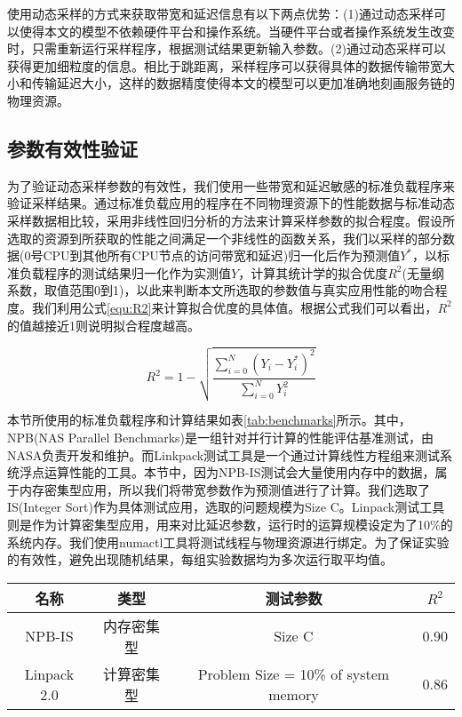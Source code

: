 使用动态采样的方式来获取带宽和延迟信息有以下两点优势：(1)通过动态采样可以使得本文的模型不依赖硬件平台和操作系统。当硬件平台或者操作系统发生改变时，只需重新运行采样程序，根据测试结果更新输入参数。(2)通过动态采样可以获得更加细粒度的信息。相比于跳距离，采样程序可以获得具体的数据传输带宽大小和传输延迟大小，这样的数据精度使得本文的模型可以更加准确地刻画服务链的物理资源。

\subsection{参数有效性验证}
为了验证动态采样参数的有效性，我们使用一些带宽和延迟敏感的标准负载程序来验证采样结果。通过标准负载应用的程序在不同物理资源下的性能数据与标准动态采样数据相比较，采用非线性回归分析的方法来计算采样参数的拟合程度。假设所选取的资源到所获取的性能之间满足一个非线性的函数关系，我们以采样的部分数据(0号CPU到其他所有CPU节点的访问带宽和延迟)归一化后作为预测值$Y^{\ast}$，以标准负载程序的测试结果归一化作为实测值$Y$，计算其统计学的拟合优度$R^{2}$(无量纲系数，取值范围0到1)，以此来判断本文所选取的参数值与真实应用性能的吻合程度。我们利用公式\ref{equ:R2}来计算拟合优度的具体值。根据公式我们可以看出，$R^{2}$的值越接近1则说明拟合程度越高。

\begin{equation}                                                             
\label{equ:R2}
R^{2} = 1 - \sqrt{\frac{\sum_{i= 0}^{N}(Y_{i}-Y_{i}^{\ast})^{2}}{\sum_{i = 0}^{N}Y_{i}^{2}}  }
\end{equation}

本节所使用的标准负载程序和计算结果如表\ref{tab:benchmarks}所示。其中，NPB(NAS Parallel Benchmarks)是一组针对并行计算的性能评估基准测试，由NASA负责开发和维护。而Linkpack测试工具是一个通过计算线性方程组来测试系统浮点运算性能的工具。本节中，因为NPB-IS测试会大量使用内存中的数据，属于内存密集型应用，所以我们将带宽参数作为预测值进行了计算。我们选取了IS(Integer Sort)作为具体测试应用，选取的问题规模为Size C。Linpack测试工具则是作为计算密集型应用，用来对比延迟参数，运行时的运算规模设定为了10\%的系统内存。我们使用numactl工具将测试线程与物理资源进行绑定。为了保证实验的有效性，避免出现随机结果，每组实验数据均为多次运行取平均值。

\begin{table}[htb]
	\centering
	\begin{tabular}{ |c|c|c|c|}\hline
		\textbf{名称} & \textbf{类型}& \textbf{测试参数} & $R^{2}$ \\ 	\hline
		NPB-IS   &	内存密集型 & Size C & 0.90\\ \hline
		Linpack 2.0	  & 计算密集型& Problem Size = 10\% of system memory & 0.86 \\ \hline
	\end{tabular}
\end{table}

